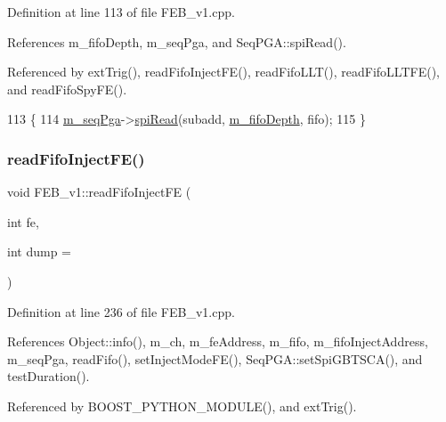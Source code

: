 Definition at line 113 of file F\+E\+B\+\_\+v1.\+cpp.



References m\+\_\+fifo\+Depth, m\+\_\+seq\+Pga, and Seq\+P\+G\+A\+::spi\+Read().



Referenced by ext\+Trig(), read\+Fifo\+Inject\+F\+E(), read\+Fifo\+L\+L\+T(), read\+Fifo\+L\+L\+T\+F\+E(), and read\+Fifo\+Spy\+F\+E().


\begin{DoxyCode}
113                                                               \{
114   \hyperlink{classFEB__v1_a6c7804ac86796f233a8393043adf2e77}{m\_seqPga}->\hyperlink{classSeqPGA_ab3d0e5e5d4014bc7a92588a76b8713d4}{spiRead}(subadd, \hyperlink{classFEB__v1_a30473bcdd8f018ad5dac728f6779df9c}{m\_fifoDepth}, fifo);
115 \}
\end{DoxyCode}
\mbox{\label{classFEB__v1_ab370d9f02895e1a44ab19d320255123e}} 
\subsubsection{\texorpdfstring{read\+Fifo\+Inject\+F\+E()}{readFifoInjectFE()}}
{\footnotesize\ttfamily void F\+E\+B\+\_\+v1\+::read\+Fifo\+Inject\+FE (\begin{DoxyParamCaption}\item[{int}]{fe,  }\item[{int}]{dump = {} }\end{DoxyParamCaption})}



Definition at line 236 of file F\+E\+B\+\_\+v1.\+cpp.



References Object\+::info(), m\+\_\+ch, m\+\_\+fe\+Address, m\+\_\+fifo, m\+\_\+fifo\+Inject\+Address, m\+\_\+seq\+Pga, read\+Fifo(), set\+Inject\+Mode\+F\+E(), Seq\+P\+G\+A\+::set\+Spi\+G\+B\+T\+S\+C\+A(), and test\+Duration().



Referenced by B\+O\+O\+S\+T\+\_\+\+P\+Y\+T\+H\+O\+N\+\_\+\+M\+O\+D\+U\+L\+E(), and ext\+Trig().


